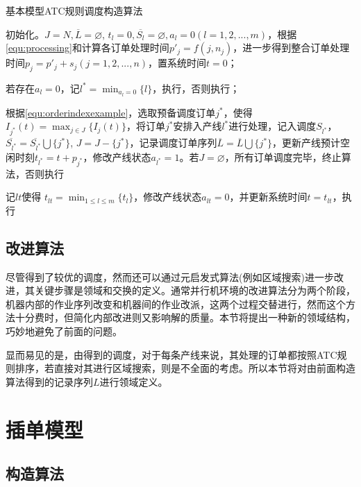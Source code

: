 \begin{algori}
基本模型ATC规则调度构造算法\label{alg:basicconstruct}

\begin{asparaenum}
\renewcommand{\labelenumi}{\bf Step\theenumi~}
\item 初始化。$J = N, \overline{L} = \varnothing$, $t_l = 0, \overline{S_l} = \varnothing, a_l=0 (l = 1,2,...,m)$，根据\eqref{equ:processing}和计算各订单处理时间$p'_j = f(j, n_j)$，进一步得到整合订单处理时间$p_j = p'_j + s_j(j = 1,2,...,n)$，置系统时间$t = 0$；
\item 若存在$a_l = 0$，记$l^* = \displaystyle\min_{a_l = 0}\{l\}$，执行，否则执行；
\item 根据\eqref{equ:orderindexexample}，选取预备调度订单$j^*$，使得$I_{j^*}(t) = \displaystyle\max_{j\in J}\{I_j(t)\}$，将订单$j^*$安排入产线$l^*$进行处理，记入调度$S_{l^*}$，$\overline{S_{l^*}}=\overline{S_{l^*}}\bigcup \{j^*\}$, $J = J -\{j^*\}$，记录调度订单序列$\overline{L} = \overline{L} \bigcup \{j^*\}$，更新产线预计空闲时刻$t_{l^*} = t + p_{j^*}$，修改产线状态$a_{l^*} = 1$。若$J = \varnothing$，所有订单调度完毕，终止算法，否则执行
\item 记$lt$使得 $t_{lt} = \displaystyle\min_{1\le l\le m}\{t_l\}$，修改产线状态$a_{lt} = 0$，并更新系统时间$t = t_{lt}$，执行
\end{asparaenum}
\end{algori}

\subsection{改进算法}
尽管得到了较优的调度，然而还可以通过元启发式算法(例如区域搜索)进一步改进，其关键步骤是领域和交换的定义。通常并行机环境的改进算法分为两个阶段，机器内部的作业序列改变和机器间的作业改派，这两个过程交替进行\cite{史烨2011}，然而这个方法十分费时，但简化内部改进则又影响解的质量。本节将提出一种新的领域结构，巧妙地避免了前面的问题。

显而易见的是，由得到的调度，对于每条产线来说，其处理的订单都按照ATC规则排序，若直接对其进行区域搜索，则是不全面的考虑。所以本节将对由前面构造算法得到的记录序列$L$进行领域定义。
\section{插单模型}
\subsection{构造算法}

